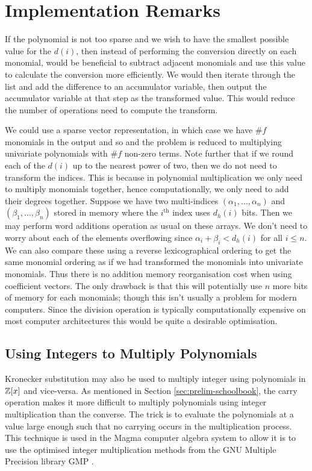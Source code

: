 \section{Implementation Remarks}

If the polynomial is not too sparse and we wish to have the smallest possible value for the $d(i)$, then instead of performing the conversion directly on each monomial, would be beneficial to subtract adjacent monomials and use this value to calculate the conversion more efficiently. We would then iterate through the list and add the difference to an accumulator variable, then output the accumulator variable at that step as the transformed value. This would reduce the number of operations need to compute the transform.

We could use a sparse vector representation, in which case we have $\# f$ monomials in the output and so and the problem is reduced to multiplying univariate polynomials with $\# f$ non-zero terms. Note further that if we round each of the $d(i)$ up to the nearest power of two, then we do not need to transform the indices. This is because in polynomial multiplication we only need to multiply monomials together, hence computationally, we only need to add their degrees together. Suppose we have two multi-indices $(\alpha_1, \ldots, \alpha_n)$ and $(\beta_1, \ldots, \beta_n)$ stored in memory where the $i^{\text{th}}$ index uses $d_h(i)$ bits. Then we may perform word additions operation as usual on these arrays. We don't need to worry about each of the elements overflowing since $\alpha_i + \beta_i < d_h(i)$ for all $i \le n$. We can also compare these using a reverse lexicographical ordering to get the same monomial ordering as if we had transformed the monomials into univariate monomials. Thus there is no addition memory reorganisation cost when using coefficient vectors. The only drawback is that this will potentially use $n$ more bits of memory for each monomials; though this isn't usually a problem for modern computers. Since the division operation is typically computationally expensive on most computer architectures\cite{instruction-times} this would be quite a desirable optimisation.

\medskip

\subsection{Using Integers to Multiply Polynomials}%
\label{sub:integers-for-poly-mult}

Kronecker substitution may also be used to multiply integer using polynomials in ${\mathbb Z}[x]$ and vice-versa. As mentioned in Section \ref{sec:prelim-schoolbook}, the carry operation makes it more difficult to multiply polynomials using integer multiplication than the converse. The trick is to evaluate the polynomials at a value large enough such that no carrying occurs in the multiplication process. This technique is used in the Magma computer algebra system to allow it is to use the optimised integer multiplication methods from the GNU Multiple Precision library GMP \cite{magma}.

